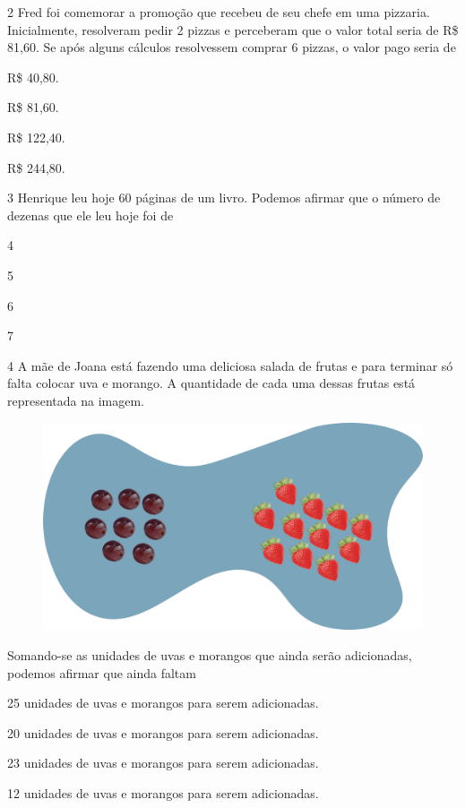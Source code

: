 \num{2} Fred foi comemorar a promoção que recebeu de seu chefe em uma pizzaria. Inicialmente, resolveram pedir 2 pizzas e perceberam que o valor total seria de R\$ 81,60. Se após alguns cálculos resolvessem comprar 6
pizzas, o valor pago seria de


\begin{escolha}
\item
  R\$ 40,80.
\item
  R\$ 81,60.
\item
  R\$ 122,40.
\item
  R\$ 244,80.
\end{escolha}


\num{3} Henrique leu hoje 60 páginas de um livro. Podemos afirmar que o número de dezenas que ele leu hoje foi de

\begin{multicols}{2}
\begin{escolha}
\item
  4
\item
  5
\item
  6
\item
  7
\end{escolha}
\end{multicols}

\pagebreak
\num{4} A mãe de Joana está fazendo uma deliciosa salada de frutas e para terminar só falta colocar uva e morango. A quantidade de cada uma dessas frutas está representada na imagem.

\begin{figure}[htpb!]
\centering
\includegraphics[width=.8\textwidth]{./media/image114.png}
\end{figure}

Somando-se as unidades de uvas e morangos que ainda serão adicionadas, podemos afirmar que ainda faltam

\begin{escolha}
\item
  25 unidades de uvas e morangos para serem adicionadas.
\item
  20 unidades de uvas e morangos para serem adicionadas.
\item
  23 unidades de uvas e morangos para serem adicionadas.
\item
  12 unidades de uvas e morangos para serem adicionadas.
\end{escolha}


